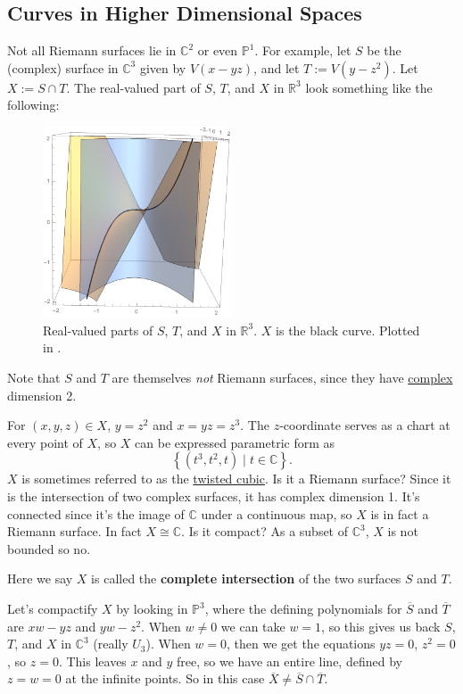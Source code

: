 \documentclass[12pt]{article}
\newcommand{\cx}{\mathbb{C}}
\newcommand{\real}{\mathbb{R}}
\newcommand{\p}{\mathbb{P}}
\newcommand{\ita}[1]{\textit{#1}}
\newcommand\setb[1]{\left \{ #1 \right \}}
\theoremstyle{definition}
\theoremstyle{remark}
\begin{document}
\subsection{Curves in Higher Dimensional Spaces}
Not all Riemann surfaces lie in $\cx^2$ or even $\p^1$. For example, let $S$ be the (complex) surface in $\cx^3$ given by $V(x-yz)$, and let $T := V(y - z^2)$. Let $X := S \cap T$. The real-valued part of $S$, $T$, and $X$ in $\real^3$ look something like the following:
\begin{figure}[H]
    \centering
    \includegraphics[width=0.5\textwidth]{17.pdf}
    \caption{Real-valued parts of $S$, $T$, and $X$ in $\real^3$. $X$ is the black curve. Plotted in \cite{Mathematica}.}
    \label{fig:Fig17}
\end{figure}
Note that $S$ and $T$ are themselves \ita{not} Riemann surfaces, since they have \underline{complex} dimension 2.

For $(x,y,z) \in X$, $y = z^2$ and $x = yz = z^3$. The $z$-coordinate serves as a chart at every point of $X$, so $X$ can be expressed parametric form as 
\begin{equation}
    \setb{ (t^3 , t^2 , t) \mid t\in \cx}.
\end{equation}
$X$ is sometimes referred to as the \underline{twisted cubic}. Is it a Riemann surface? Since it is the intersection of two complex surfaces, it has complex dimension 1. It's connected since it's the image of $\cx$ under a continuous map, so $X$ is in fact a Riemann surface. In fact $X \cong \cx$. Is it compact? As a subset of $\cx^3$, $X$ is not bounded so no.

Here we say $X$ is called the \textbf{complete intersection} of the two surfaces $S$ and $T$.

Let's compactify $X$ by looking in $\p^3$, where the defining polynomials for $\overline{S}$ and $\overline{T}$ are $xw - yz$ and $yw - z^2$. When $w \neq 0$ we can take $w = 1$, so this gives us back $S$, $T$, and $X$ in $\cx^3$ (really $U_3$). When $w = 0$, then we get the equations $yz = 0$, $z^2 = 0$, so $z = 0$. This leaves $x$ and $y$ free, so we have an entire line, defined by $z = w = 0$ at the infinite points. So in this case $\overline{X} \neq \overline{S} \cap \overline{T}$.
\end{document}
